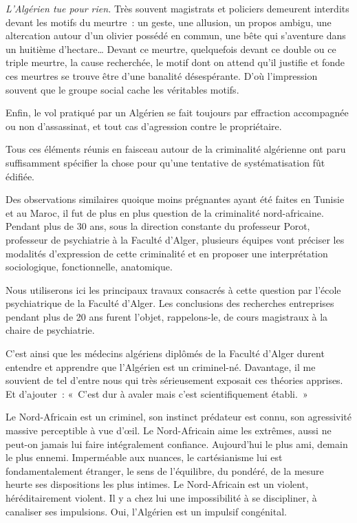 \documentclass[french,twoside]{book} %
\begin{document}
\emph{L’Algérien tue pour rien.} Très souvent magistrats et policiers demeurent interdits devant les motifs du meurtre : un geste, une allusion, un propos ambigu, une altercation autour d’un olivier possédé en commun, une bête qui s’aventure dans un huitième d’hectare… Devant ce meurtre, quelquefois devant ce double ou ce triple meurtre, la cause recherchée, le motif dont on attend   qu’il justifie et fonde ces meurtres se trouve être d’une banalité désespérante. D’où l’impression souvent que le groupe social cache les véritables motifs.\par
Enfin, le vol pratiqué par un Algérien se fait toujours par effraction accompagnée ou non d’assassinat, et tout cas d’agression contre le propriétaire.\par
Tous ces éléments réunis en faisceau autour de la criminalité algérienne ont paru suffisamment spécifier la chose pour qu’une tentative de systématisation fût édifiée.\par
Des observations similaires quoique moins prégnantes ayant été faites en Tunisie et au Maroc, il fut de plus en plus question de la criminalité nord-africaine. Pendant plus de 30 ans, sous la direction constante du professeur Porot, professeur de psychiatrie à la Faculté d’Alger, plusieurs équipes vont préciser les modalités d’expression de cette criminalité et en proposer une interprétation sociologique, fonctionnelle, anatomique.\par
Nous utiliserons ici les principaux travaux consacrés à cette question par l’école psychiatrique de la Faculté d’Alger. Les conclusions des recherches entreprises pendant plus de 20 ans furent l’objet, rappelons-le, de cours magistraux à la chaire de psychiatrie.\par
C’est ainsi que les médecins algériens diplômés de la Faculté d’Alger durent entendre et apprendre que l’Algérien est un criminel-né. Davantage, il me souvient de tel d’entre nous qui très sérieusement exposait ces théories apprises. Et d’ajouter : « C’est dur à avaler mais c’est scientifiquement établi. »\par
Le Nord-Africain est un criminel, son instinct prédateur est connu, son agressivité massive perceptible à vue d’œil. Le Nord-Africain aime les extrêmes, aussi ne peut-on jamais lui faire intégralement confiance. Aujourd’hui le plus ami, demain le plus ennemi. Imperméable aux nuances, le cartésianisme lui est fondamentalement étranger, le sens de l’équilibre, du pondéré, de la mesure heurte ses dispositions les plus intimes. Le Nord-Africain est un violent, héréditairement violent. Il y a chez lui une impossibilité à se discipliner, à canaliser ses impulsions. Oui, l’Algérien est un impulsif congénital.\par
\end{document}
